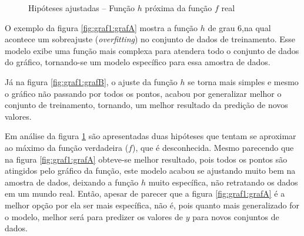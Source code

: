  \begin{figure}[h!]
    \centering
    \quad
    
    \caption{Hipóteses ajustadas – Função ${h}$ próxima da função ${f}$ real} \label{fig:graf1}
        
\end{figure}


O exemplo da figura \ref{fig:graf1:grafA} mostra a função ${h}$  de grau 6,na qual acontece um sobreajuste (\textit{overfitting}) no conjunto de dados de treinamento. Esse modelo exibe uma função mais complexa para atendera todo o conjunto de dados do gráfico, tornando-se um modelo específico para essa amostra de dados. 

Já na figura \ref{fig:graf1:grafB}, o ajuste da função ${h}$ se torna mais simples e mesmo o gráfico não passando por todos os pontos, acabou por generalizar melhor o conjunto de treinamento, tornando, um melhor resultado da predição de novos valores. 

Em análise da figura \ref{fig:graf1} são apresentadas duas hipóteses que tentam se aproximar ao máximo da função verdadeira (${f}$), que é desconhecida. Mesmo parecendo que na figura \ref{fig:graf1:grafA} obteve-se melhor resultado, pois todos os pontos são atingidos pelo gráfico da função, este modelo acabou se ajustando muito bem na amostra de dados, deixando a função ${h}$ muito específica, não retratando os dados em um mundo real. Então, apesar de parecer que a figura \ref{fig:graf1:grafA} é  a melhor opção por ela ser mais específica, não é, pois quanto mais generalizado for o modelo, melhor será para predizer os valores de ${y}$ para novos conjuntos de dados.




